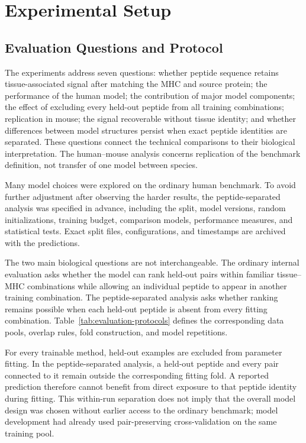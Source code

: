 \section{Experimental Setup}

\subsection{Evaluation Questions and Protocol}

The experiments address seven questions: whether peptide sequence retains tissue-associated signal after matching the MHC and source protein; the performance of the human model; the contribution of major model components; the effect of excluding every held-out peptide from all training combinations; replication in mouse; the signal recoverable without tissue identity; and whether differences between model structures persist when exact peptide identities are separated. These questions connect the technical comparisons to their biological interpretation. The human--mouse analysis concerns replication of the benchmark definition, not transfer of one model between species.

Many model choices were explored on the ordinary human benchmark. To avoid further adjustment after observing the harder results, the peptide-separated analysis was specified in advance, including the split, model versions, random initializations, training budget, comparison models, performance measures, and statistical tests. Exact split files, configurations, and timestamps are archived with the predictions.

The two main biological questions are not interchangeable. The ordinary internal evaluation asks whether the model can rank held-out pairs within familiar tissue--MHC combinations while allowing an individual peptide to appear in another training combination. The peptide-separated analysis asks whether ranking remains possible when each held-out peptide is absent from every fitting combination. Table~\ref{tab:evaluation-protocols} defines the corresponding data pools, overlap rules, fold construction, and model repetitions.

For every trainable method, held-out examples are excluded from parameter fitting. In the peptide-separated analysis, a held-out peptide and every pair connected to it remain outside the corresponding fitting fold. A reported prediction therefore cannot benefit from direct exposure to that peptide identity during fitting. This within-run separation does not imply that the overall model design was chosen without earlier access to the ordinary benchmark; model development had already used pair-preserving cross-validation on the same training pool.

